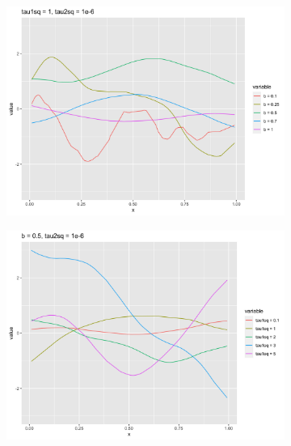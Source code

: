 \documentclass[11pt]{article}
\begin{document}
\begin{enumerate}[(A)]
\begin{figure}
    \centering
    \begin{subfigure}[t]{0.6\textwidth}
        \centering
        \includegraphics[width=\linewidth]{Ex6/figures/GP_bseq_M52.png} 
    \end{subfigure}
    \begin{subfigure}[t]{0.6\textwidth}
        \centering
        \includegraphics[width=\linewidth]{Ex6/figures/GP_tau1sq_seq_M52.png} 
    \end{subfigure}
    \centering
    \begin{subfigure}[t]{0.6\textwidth}
        \centering

\end{subfigure}
\end{figure}
\end{enumerate}
\end{document}
